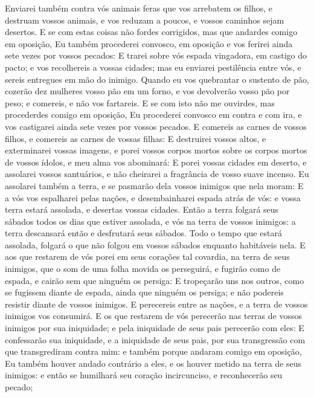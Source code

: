 {Enviarei também contra vós animais feras que vos arrebatem os filhos, e destruam vossos animais, e vos reduzam a poucos, e vossos caminhos sejam desertos.
E se com estas coisas não fordes corrigidos, mas que andardes comigo em oposição,
Eu também procederei convosco, em oposição e vos ferirei ainda sete vezes por vossos pecados:
E trarei sobre vós espada vingadora, em castigo do pacto; e vos recolhereis a vossas cidades; mas eu enviarei pestilência entre vós, e sereis entregues em mão do inimigo.
Quando eu vos quebrantar o sustento de pão, cozerão dez mulheres vosso pão em um forno, e vos devolverão vosso pão por peso; e comereis, e não vos fartareis.
E se com isto não me ouvirdes, mas procederdes comigo em oposição,
Eu procederei convosco em contra e com ira, e vos castigarei ainda sete vezes por vossos pecados.
E comereis as carnes de vossos filhos, e comereis as carnes de vossas filhas:
E destruirei vossos altos, e exterminarei vossas imagens, e porei vossos corpos mortos sobre os corpos mortos de vossos ídolos, e meu alma vos abominará:
E porei vossas cidades em deserto, e assolarei vossos santuários, e não cheirarei a fragrância de vosso suave incenso.
Eu assolarei também a terra, e se pasmarão dela vossos inimigos que nela moram:
E a vós vos espalharei pelas nações, e desembainharei espada atrás de vós: e vossa terra estará assolada, e desertas vossas cidades.
Então a terra folgará seus sábados todos os dias que estiver assolada, e vós na terra de vossos inimigos: a terra descansará então e desfrutará seus sábados.
Todo o tempo que estará assolada, folgará o que não folgou em vossos sábados enquanto habitáveis nela.
E aos que restarem de vós porei em seus corações tal covardia, na terra de seus inimigos, que o som de uma folha movida os perseguirá, e fugirão como de espada, e cairão sem que ninguém os persiga:
E tropeçarão uns nos outros, como se fugissem diante de espada, ainda que ninguém os persiga; e não podereis resistir diante de vossos inimigos.
E perecereis entre as nações, e a terra de vossos inimigos vos consumirá.
E os que restarem de vós perecerão nas terras de vossos inimigos por sua iniquidade; e pela iniquidade de seus pais perecerão com eles:
E confessarão sua iniquidade, e a iniquidade de seus pais, por sua transgressão com que transgrediram contra mim: e também porque andaram comigo em oposição,
Eu também houver andado contrário a eles, e os houver metido na terra de seus inimigos: e então se humilhará seu coração incircunciso, e reconhecerão seu pecado;
}

